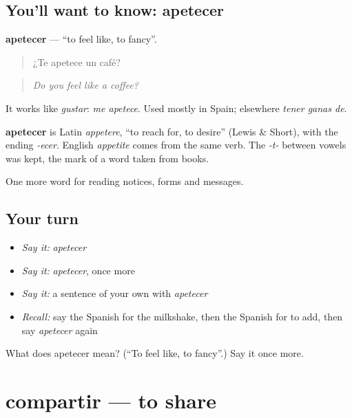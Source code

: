 \subsection*{You'll want to know: apetecer}
\textbf{apetecer} — \textquotedblleft{}to feel like, to fancy\textquotedblright{}.

\begin{quote}
¿Te apetece un café?
\end{quote}

\begin{quote}
\emph{Do you feel like a coffee?}
\end{quote}

It works like \emph{gustar}: \emph{me apetece}. Used mostly in Spain; elsewhere \emph{tener ganas de}.

\begin{cousinweb}
\textbf{apetecer} is Latin \emph{appetere}, \textquotedblleft{}to reach for, to desire\textquotedblright{} (Lewis \& Short), with the ending \emph{-ecer}. English \emph{appetite} comes from the same verb. The \emph{-t-} between vowels was kept, the mark of a word taken from books.
\end{cousinweb}

\begin{grammarlens}[title={What you've built}]
One more word for reading notices, forms and messages.
\end{grammarlens}

\subsection*{Your turn}
\begin{itemize}
\raggedright
  \item \emph{Say it:} \emph{apetecer}
  \item \emph{Say it:} \emph{apetecer}, once more
  \item \emph{Say it:} a sentence of your own with \emph{apetecer}
  \item \emph{Recall:} say the Spanish for the milkshake, then the Spanish for to add, then say \emph{apetecer} again
\end{itemize}

\begin{tcolorbox}[breakable,colback=teal!4,colframe=teal!35!black,title={Before you move on}]
What does apetecer mean? (\textquotedblleft{}To feel like, to fancy\textquotedblright{}.) Say it once more.
\end{tcolorbox}
\section[compartir]{compartir — to share}

